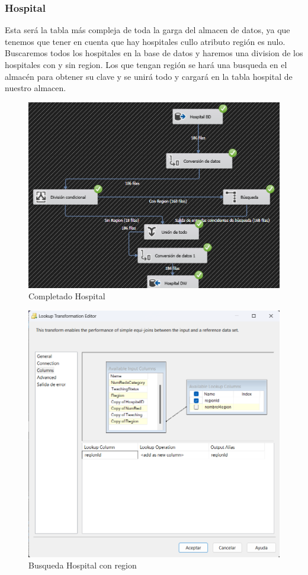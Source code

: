 \documentclass{article}
\begin{document}
	\subsubsection{Hospital}
	Esta será la tabla más compleja de toda la garga del almacen de datos, ya que tenemos que tener en cuenta que hay hospitales cullo atributo región es nulo. Buscaremos todos los hospitales en la base de datos y haremos una division de los hospitales con y sin region. Los que tengan región se hará una busqueda en el almacén para obtener su clave y se unirá todo y cargará en la tabla hospital de nuestro almacen.
	\begin{figure}[H]
		\centering
		\includegraphics[width=.7\linewidth]{./images/completados/hospital.png}
		\caption{Completado Hospital}
	\end{figure}
	\begin{figure}[H]
		\centering
		\includegraphics[width=.7\linewidth]{./images/busquedas/hospital_con_region.png}
		\caption{Busqueda Hospital con region}
	\end{figure}
\end{document}
